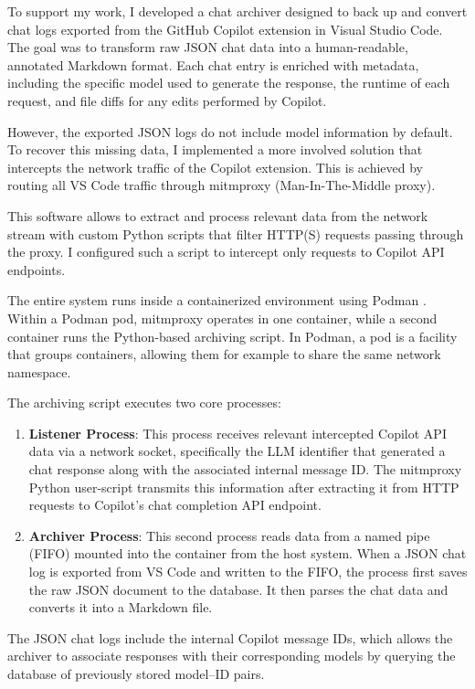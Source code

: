 To support my work, I developed a chat archiver designed to back up and convert chat logs exported from the GitHub Copilot extension in Visual Studio Code. The goal was to transform raw JSON chat data into a human-readable, annotated Markdown format.
Each chat entry is enriched with metadata, including the specific model used to generate the response, the runtime of each request, and file diffs for any edits performed by Copilot.

However, the exported JSON logs do not include model information by default.
To recover this missing data, I implemented a more involved solution that intercepts the network traffic of the Copilot extension.
This is achieved by routing all VS Code traffic through mitmproxy \cite{mitmproxy} (Man-In-The-Middle proxy).

This software allows to extract and process relevant data from the network stream with custom Python scripts that filter HTTP(S) requests passing through the proxy.
I configured such a script to intercept only requests to Copilot API endpoints.

The entire system runs inside a containerized environment using Podman \cite{podman}. 
Within a Podman pod, mitmproxy operates in one container, while a second container runs the Python-based archiving script.
In Podman, a pod is a facility that groups containers, allowing them for example to share the same network namespace.

The archiving script executes two core processes:
\begin{enumerate}[topsep=0pt]
  \item \textbf{Listener Process}: This process receives relevant intercepted Copilot API data via a network socket, specifically the LLM identifier that generated a chat response along with the associated internal message ID.
  The mitmproxy Python user-script transmits this information after extracting it from HTTP requests to Copilot's chat completion API endpoint.

  \item \textbf{Archiver Process}: This second process reads data from a named pipe (FIFO) mounted into the container from the host system. When a JSON chat log is exported from VS Code and written to the FIFO, the process first saves the raw JSON document to the database. It then parses the chat data and converts it into a Markdown file.
\end{enumerate}

The JSON chat logs include the internal Copilot message IDs, which allows the archiver to associate responses with their corresponding models by querying the database of previously stored model--ID pairs. 

